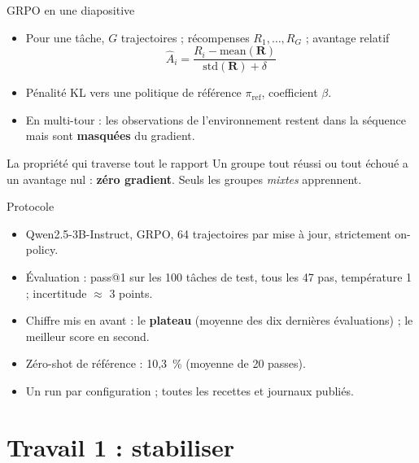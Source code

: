 \documentclass[aspectratio=169,11pt]{beamer}
\begin{document}
\begin{frame}{GRPO en une diapositive}
\begin{itemize}
    \item Pour une tâche, $G$ trajectoires ; récompenses $R_1,\dots,R_G$ ; avantage relatif
    \[ \hat A_i = \frac{R_i - \mathrm{mean}(\mathbf R)}{\mathrm{std}(\mathbf R)+\delta} \]
    \item Pénalité KL vers une politique de référence $\pi_{\text{ref}}$, coefficient $\beta$.
    \item En multi-tour : les observations de l'environnement restent dans la séquence mais sont \textbf{masquées} du gradient.
\end{itemize}
\begin{block}{La propriété qui traverse tout le rapport}
Un groupe tout réussi ou tout échoué a un avantage nul : \textbf{zéro gradient}. Seuls les groupes \emph{mixtes} apprennent.
\end{block}
\end{frame}

\begin{frame}{Protocole}
\begin{itemize}
    \item Qwen2.5-3B-Instruct, GRPO, 64 trajectoires par mise à jour, strictement on-policy.
    \item Évaluation : pass@1 sur les 100 tâches de test, tous les 47 pas, température 1 ; incertitude $\approx$ 3 points.
    \item Chiffre mis en avant : le \textbf{plateau} (moyenne des dix dernières évaluations) ; le meilleur score en second.
    \item Zéro-shot de référence : 10,3~\% (moyenne de 20 passes).
    \item Un run par configuration ; toutes les recettes et journaux publiés.
\end{itemize}
\end{frame}

\section{Travail 1 : stabiliser}
\end{document}
